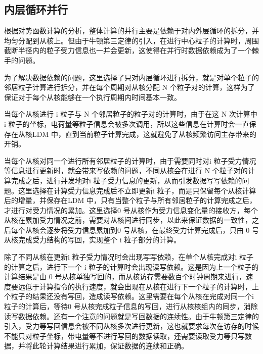 \subsection{内层循环并行}
根据对势函数计算的分析，整体计算的并行主要是依赖于对内外层循环的拆分，并均匀分配到从核上。但由于牛顿第三定律的引入，在进行中心粒子的计算时，周围截断半径内的粒子受力信息也一并会更新，这使得在并行时数据依赖成为了一个棘手的问题。

为了解决数据依赖的问题，这里选择了只对内层循环进行拆分，就是对单个粒子的邻居粒子计算进行拆分，并在每个周期对从核分配 N 个粒子对的计算，这样为了保证对于每个从核能够在一个执行周期内时间基本一致。



当每个从核进行 i 粒子与 N 个邻居粒子的粒子对的计算时，由于在这 N 次计算中i 粒子的坐标，电荷量等粒子信息会被多次调用，所以这些信息在计算时会一直保存在从核LDM 中，直到当前粒子计算完成，这就避免了从核频繁访问主存带来的开销。

当每个从核对同一个进行所有邻居粒子的计算时，由于需要同时对i 粒子受力情况等信息进行更新时，就会带来写依赖的问题，不同从核会在进行 N 个粒子对的计算完成之后，进行并发地对i 粒子受力信息的更新，从而引发数据写写依赖的问题。这里选择在计算受力信息完成后不立即更新i 粒子，而是只保留每个从核计算后的增量，并保存在LDM 中，只有当整个粒子与所有邻居粒子的计算完成之后，才进行对受力情况的累加。这里选择0 号从核作为受力信息变化量的接收方，每个从核在累加受力情况之前，需要对从核间进行同步，以此来保证数据的一致性，之后每个从核会逐步将受力信息累加到0 号从核，在最终受力计算完成后，只由 0 号从核完成受力结构的写回，实现整个 i 粒子部分的计算。

除了不同从核在更新i 粒子受力情况时会出现写写依赖，在单个从核完成对i 粒子的计算之后，进行下一个 i 粒子的计算时会出现读写依赖。这是因为上一个粒子的计算结果是由 0 号从核单独写回的，而从核访存需要数百个时钟周期来进行，速度要远低于计算指令的执行速度，就会出现在从核在进行下一个粒子的计算时，上个粒子的结果还没有写回，造成读写依赖。这里需要在每个从核在完成对同一个i 粒子的计算后，等待0 号从核完成粒子信息的写回，进行从核核组内的同步，消除读写数据依赖。还有一个注意的问题就是写回数据的连续性。由于牛顿第三定律的引入，受力等写回信息会被不同从核多次进行更新，这也就要求每次在访存的时候不能只对粒子坐标，带电量等不进行写回的数据读取，还需要读取受力等只写数据，并将此轮计算结果进行累加，保证数据的连续和正确。

